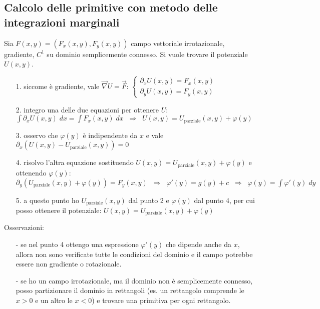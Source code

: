 \documentclass[a4paper]{article}
\newcommand\nab{\vec{\nabla}} %
\begin{document}
\subsection{Calcolo delle primitive con metodo delle integrazioni marginali}
Sia \(F(x,y) = (F_x(x,y), F_y(x,y))\) campo vettoriale irrotazionale, gradiente, \(C^1\) su dominio semplicemente connesso. Si vuole trovare il potenziale \(U(x,y)\).
\begin{itemize}
	\item[1.] siccome è gradiente, vale \(\nab U = \vec{F}\):
	\(\begin{cases}
		\partial_x U(x,y) = F_x(x,y) \\
		\partial_y U(x,y) = F_y(x,y)
	\end{cases}\)

	\item[2.] integro una delle due equazioni per ottenere \(U\): \\
	\(\displaystyle \int \partial_x U(x,y) \; dx = \int F_x(x,y) \; dx \;\; \Rightarrow \;\; U(x,y) = U_\text{parziale}(x,y) + \varphi(y)\)

	\item[3.] osservo che \(\varphi(y)\) è indipendente da \(x\) e vale \(\partial_x (U(x,y) - U_\text{parziale}(x,y)) = 0\)
	
	\item[4.] risolvo l'altra equazione sostituendo \(U(x,y) = U_\text{parziale}(x,y) + \varphi(y)\) e ottenendo \(\varphi(y)\): \\
	\(\displaystyle \partial_y (U_\text{parziale}(x,y) + \varphi(y)) = F_y(x,y) \;\; \Rightarrow \;\; \varphi'(y) = g(y) + c \;\; \Rightarrow \;\; \varphi(y) = \int \varphi'(y) \; dy \)

	\item[5.] a questo punto ho \(U_\text{parziale}(x,y)\) dal punto 2 e \(\varphi(y)\) dal punto 4, per cui posso ottenere il potenziale: \(U(x,y) = U_\text{parziale}(x,y) + \varphi(y)\)
\end{itemize}
Osservazioni:
\begin{itemize}
	\item[-] se nel punto 4 ottengo una espressione \(\varphi'(y)\) che dipende anche da \(x\), allora non sono verificate tutte
	le condizioni del dominio e il campo potrebbe essere non gradiente o rotazionale.
	\item[-] se ho un campo irrotazionale, ma il dominio non è semplicemente connesso, posso partizionare il dominio in rettangoli
	(es. un rettangolo comprende le \(x > 0\) e un altro le \(x < 0\)) e trovare una primitiva per ogni rettangolo.
\end{itemize}
\end{document}
